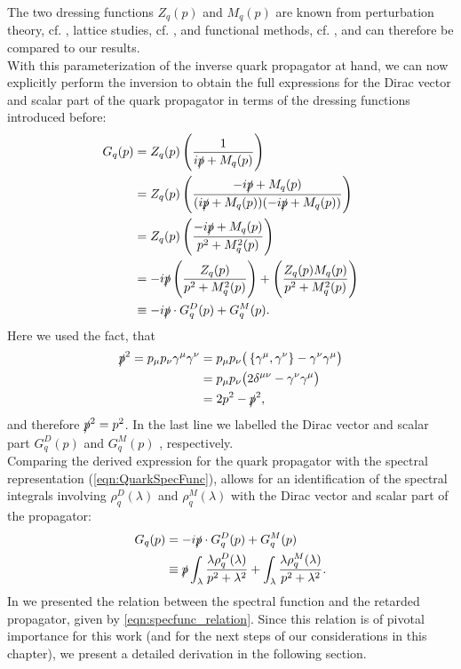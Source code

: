 The two dressing functions $Z_q(p)$ and $M_q(p)$ are known from perturbation theory, cf. \cite{PelaezTissierWschebor2014, BarriosGraceyPelaezReinosa2021}, lattice studies, cf. \cite{Parappilly2005,Parappilly2006}, and functional methods, cf. \cite{GaoPapavassiliouPawlowski2021}, and can therefore be compared to our results.\\
With this parameterization of the inverse quark propagator at hand, we can now explicitly perform the inversion to obtain the full expressions for the Dirac vector and scalar part of the quark propagator in terms of the dressing functions introduced before:
\begin{equation}
\begin{aligned}
	 G_q(p) &= Z_q(p)\left(\frac{1}{i\slashed{p} + M_q(p)}\right)  \\
		&= Z_q(p)\left(\frac{-i\slashed{p} + M_q(p)}{(i\slashed{p} + M_q(p))(-i\slashed{p} + M_q(p))}\right) \\
		&= Z_q(p)\left(\frac{-i\slashed{p} + M_q(p)}{p^2 + M_q^2(p)}\right) \\
		&= -i\slashed{p} \left(\frac{Z_q(p)}{p^2 + M_q^2(p)}\right) +  \left(\frac{Z_q(p)M_q(p)}{p^2 + M_q^2(p)}\right)\\
		&\equiv -i\slashed{p}\cdot G_q^D(p) + G_q^M(p).
\end{aligned} \label{eqn:quark_prop_inversion}
\end{equation}
Here we used the fact, that 
\begin{equation}
	\begin{aligned}
		\slashed{p}^2 = p_{\mu}p_{\nu}\gamma^{\mu}\gamma^{\nu} &= p_{\mu}p_{\nu}\big(\left\{\gamma^{\mu},\gamma^{\nu}\right\} - \gamma^{\nu}\gamma^{\mu}\big)\\
		&= p_{\mu}p_{\nu}\big(2\delta^{\mu\nu} - \gamma^{\nu}\gamma^{\mu}\big)\\
		&= 2p^2 - \slashed{p}^2,
	\end{aligned}
\end{equation}
and therefore $\slashed{p}^2 = p^2$. In the last line we labelled the Dirac vector and scalar part $G_q^D(p)$ and $G_q^M(p)$ , respectively.\\
Comparing the derived expression for the quark propagator with the spectral representation (\ref{eqn:QuarkSpecFunc}), allows for an identification of the spectral integrals involving $\rho_q^{D}(\lambda)$ and $\rho_q^{M}(\lambda)$ with the Dirac vector and scalar part of the propagator:
\begin{equation}
\begin{aligned}
	G_q(p) &=-i\slashed{p}\cdot G_q^D(p) + G_q^M(p)\\
	&\equiv \slashed{p} \int_\lambda\frac{\lambda\rho_q^{D}(\lambda)}{p^2+\lambda^2} + \int_\lambda\frac{\lambda\rho_q^M(\lambda)}{p^2+\lambda^2}.
	\end{aligned}\label{eqn:quark_prop_identification}
\end{equation}
In  we presented the relation between the spectral function and the retarded propagator, given by \eqref{eqn:specfunc_relation}. Since this relation is of pivotal importance for this work (and for the next steps of our considerations in this chapter), we present a detailed derivation in the following section. 

